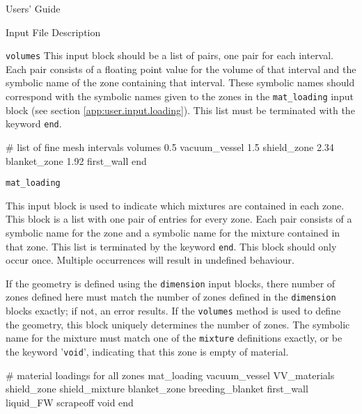 \begin{chapter}{Users' Guide\label{app:user.guide}}
\begin{section}{Input File Description\label{app:user.input}}
\begin{subsection}{\texttt{volumes}\label{app:user.input.vol}}
      This input block should be a list of pairs, one pair for each
      interval.  Each pair consists of a floating point value for the
      volume of that interval and the symbolic name of the zone
      containing that interval.  These symbolic names should
      correspond with the symbolic names given to the zones in the
      \texttt{mat\_loading} input block (see section
      \ref{app:user.input.loading}).  This list must be terminated
      with the keyword \texttt{end}.

      \begin{center}
        \renewcommand{\baselinestretch}{1}\normalsize
        \begin{boxedverbatim}
# list of fine mesh intervals
volumes
   0.5     vacuum_vessel
   1.5     shield_zone
   2.34    blanket_zone
   1.92    first_wall
end          
\end{boxedverbatim}
      \end{center}
    \end{subsection}

    \begin{subsection}{\texttt{mat\_loading}\label{app:user.input.loading}}
      
      This input block is used to indicate which mixtures are
      contained in each zone.  This block is a list with one pair of
      entries for every zone.  Each pair consists of a symbolic name
      for the zone and a symbolic name for the mixture contained in
      that zone.  This list is terminated by the keyword \texttt{end}.
      This block should only occur once.  Multiple occurrences will
      result in undefined behaviour.

      If the geometry is defined using the \texttt{dimension} input
      blocks, there number of zones defined here must match the number
      of zones defined in the \texttt{dimension} blocks exactly; if
      not, an error results.  If the \texttt{volumes} method is used
      to define the geometry, this block uniquely determines the
      number of zones.  The symbolic name for the mixture must match
      one of the \texttt{mixture} definitions exactly, or be the
      keyword '\texttt{void}', indicating that this zone is empty of
      material.

      \begin{center}
        \renewcommand{\baselinestretch}{1}\normalsize
        \begin{boxedverbatim}
# material loadings for all zones
mat_loading
   vacuum_vessel  VV_materials
   shield_zone    shield_mixture
   blanket_zone   breeding_blanket
   first_wall     liquid_FW
   scrapeoff      void          
end
\end{boxedverbatim}
      \end{center}
      

\end{subsection}
\end{section}
\end{chapter}
